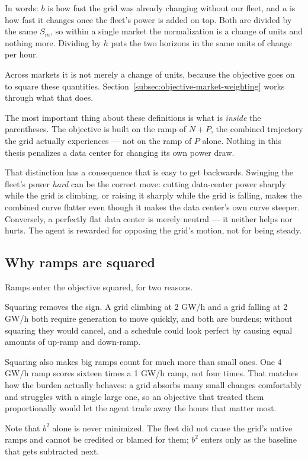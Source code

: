 ﻿\documentclass[12pt]{article}
\begin{document}
In words: \(b\) is how fast the grid was already changing without our fleet, and
\(a\) is how fast it changes once the fleet's power is added on top. Both are
divided by the same \(S_m\), so within a single market the normalization is a
change of units and nothing more. Dividing by \(h\) puts the two horizons in the
same units of change per hour.

Across markets it is not merely a change of units, because the objective goes on
to square these quantities. Section~\ref{subsec:objective-market-weighting}
works through what that does.

The most important thing about these definitions is what is \emph{inside} the
parentheses. The objective is built on the ramp of \(N+P\), the combined
trajectory the grid actually experiences --- not on the ramp of \(P\) alone.
Nothing in this thesis penalizes a data center for changing its own power draw.

That distinction has a consequence that is easy to get backwards. Swinging the
fleet's power \emph{hard} can be the correct move: cutting data-center power
sharply while the grid is climbing, or raising it sharply while the grid is
falling, makes the combined curve flatter even though it makes the data
center's own curve steeper. Conversely, a perfectly flat data center is merely
neutral --- it neither helps nor hurts. The agent is rewarded for opposing the
grid's motion, not for being steady.

\subsection{Why ramps are squared}
\label{subsec:objective-squared-ramp}

Ramps enter the objective squared, for two reasons.

Squaring removes the sign. A grid climbing at 2 GW/h and a grid falling at
2 GW/h both require generation to move quickly, and both are burdens; without
squaring they would cancel, and a schedule could look perfect by causing equal
amounts of up-ramp and down-ramp.

Squaring also makes big ramps count for much more than small ones. One 4 GW/h
ramp scores sixteen times a 1 GW/h ramp, not four times. That matches how the
burden actually behaves: a grid absorbs many small changes comfortably and
struggles with a single large one, so an objective that treated them
proportionally would let the agent trade away the hours that matter most.

Note that \(b^2\) alone is never minimized. The fleet did not cause the grid's
native ramps and cannot be credited or blamed for them; \(b^2\) enters only as
the baseline that gets subtracted next.
\end{document}
